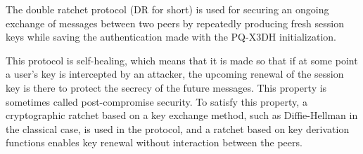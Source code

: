 

The double ratchet protocol (DR for short) is used for securing an ongoing exchange of messages between two
peers by repeatedly producing fresh session keys while saving the authentication made with the
PQ-X3DH initialization.\par
This protocol is self-healing, which means that it is made so that if at some point a user's key is
intercepted by an attacker, the upcoming renewal of the session key is there to protect the secrecy
of the future messages.
This property is sometimes called post-compromise security.
To satisfy this property, a cryptographic ratchet based on a key exchange method, such as
Diffie-Hellman in the classical case, is used in the protocol, and a ratchet based on key derivation
functions enables key renewal without interaction between the peers.\par

